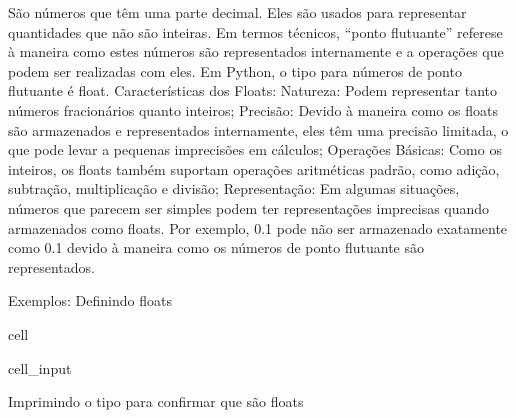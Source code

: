 \documentclass[letterpaper,10pt,english]{jupyterBook}
\begin{document}
\sphinxAtStartPar
São números que têm uma parte decimal. Eles são usados para representar quantidades que não são inteiras. Em termos técnicos, “ponto flutuante” refere\sphinxhyphen{}se à maneira como estes números são representados internamente e a operações que podem ser realizadas com eles. Em Python, o tipo para números de ponto flutuante é float.
Características dos Floats:
Natureza: Podem representar tanto números fracionários quanto inteiros;
Precisão: Devido à maneira como os floats são armazenados e representados internamente, eles têm uma precisão limitada, o que pode levar a pequenas imprecisões em cálculos;
Operações Básicas: Como os inteiros, os floats também suportam operações aritméticas padrão, como adição, subtração, multiplicação e divisão;
Representação: Em algumas situações, números que parecem ser simples podem ter representações imprecisas quando armazenados como floats. Por exemplo, 0.1 pode não ser armazenado exatamente como 0.1 devido à maneira como os números de ponto flutuante são representados.

\sphinxAtStartPar
Exemplos:
Definindo floats

\begin{sphinxuseclass}{cell}\begin{sphinxVerbatimInput}

\begin{sphinxuseclass}{cell_input}
\begin{sphinxVerbatim}[commandchars=\\\{\}]
  
  
   
\end{sphinxVerbatim}

\end{sphinxuseclass}\end{sphinxVerbatimInput}

\end{sphinxuseclass}
\sphinxAtStartPar
Imprimindo o tipo para confirmar que são floats
\end{document}

